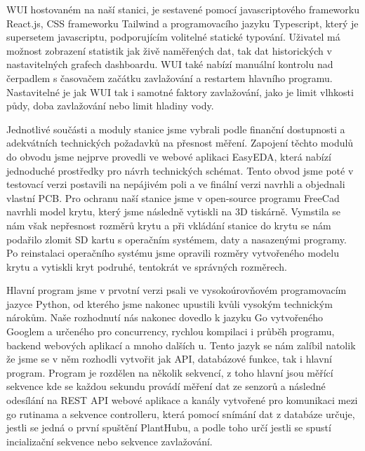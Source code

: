\documentclass[12pt,a4paper]{article}
\begin{document}
\ac{WUI} hostovaném na naší stanici, je sestavené pomocí javascriptového frameworku React.js, CSS frameworku Tailwind a programovacího jazyku Typescript, který je supersetem javascriptu, podporujícím volitelné statické typování. Uživatel má možnost zobrazení statistik jak živě naměřených dat, tak dat historických v nastavitelných grafech dashboardu. \ac{WUI} také nabízí manuální kontrolu nad čerpadlem s časovačem začátku zavlažování a restartem hlavního programu. Nastavitelné je jak \ac{WUI} tak i samotné faktory zavlažování, jako je limit vlhkosti půdy, doba zavlažování nebo limit hladiny vody.

Jednotlivé součásti a moduly stanice jsme vybrali podle finanční dostupnosti a adekvátních technických požadavků na přesnost měření. Zapojení těchto modulů do obvodu jsme nejprve provedli ve webové aplikaci EasyEDA, která nabízí jednoduché prostředky pro návrh technických schémat. Tento obvod jsme poté v testovací verzi postavili na nepájivém poli a ve finální verzi navrhli a objednali vlastní \ac{PCB}. Pro ochranu naší stanice jsme v open-source programu FreeCad navrhli model krytu, který jsme následně vytiskli na 3D tiskárně. Vymstila se nám však nepřesnost rozměrů krytu a při vkládání stanice do krytu se nám podařilo zlomit SD kartu s operačním systémem, daty a nasazenými programy. Po reinstalaci operačního systému jsme opravili rozměry vytvořeného modelu krytu a vytiskli kryt podruhé, tentokrát ve správných rozměrech.

Hlavní program jsme v prvotní verzi psali ve vysokoúrovňovém programovacím jazyce Python, od kterého jsme nakonec upustili kvůli vysokým technickým nárokům. Naše rozhodnutí nás nakonec dovedlo k jazyku Go vytvořeného Googlem a určeného pro concurrency, rychlou kompilaci i průběh programu, backend webových aplikací a mnoho dalších u. Tento jazyk se nám zalíbil natolik že jsme se v něm rozhodli vytvořit jak \ac{API}, databázové funkce, tak i hlavní program. Program je rozdělen na několik sekvencí, z toho hlavní jsou měřící sekvence kde se každou sekundu provádí měření dat ze senzorů a následné odesílání na \ac{REST} \ac{API} webové aplikace a kanály vytvořené pro komunikaci mezi go rutinama a sekvence controlleru, která pomocí snímání dat z databáze určuje, jestli se jedná o první spuštění PlantHubu, a podle toho určí jestli se spustí incializační sekvence nebo sekvence zavlažování.

\clearpage
\end{document}

